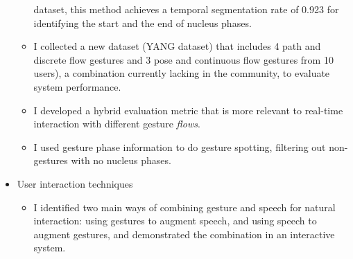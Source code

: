 \begin{itemize}
\begin{itemize}
    dataset, this method achieves a temporal segmentation rate of 0.923 for
    identifying the start and the end of nucleus phases.
    \item I collected a new dataset (YANG dataset) that includes 4 path and discrete flow gestures and 3 pose and
    continuous flow gestures from 10 users), a combination currently
    lacking in the community, to evaluate system performance.
    \item I developed a hybrid evaluation metric that is more relevant to
    real-time interaction with different gesture \textit{flows}.
    \item I used gesture phase information to do gesture spotting, filtering out
non-gestures with no nucleus phases.
  \end{itemize}
  \item User interaction techniques
  \begin{itemize}
  \item I identified two main ways of combining gesture and speech for natural
  interaction: using gestures to augment speech, and using speech to augment
  gestures, and demonstrated the combination in an interactive system.
  \end{itemize}
\end{itemize}